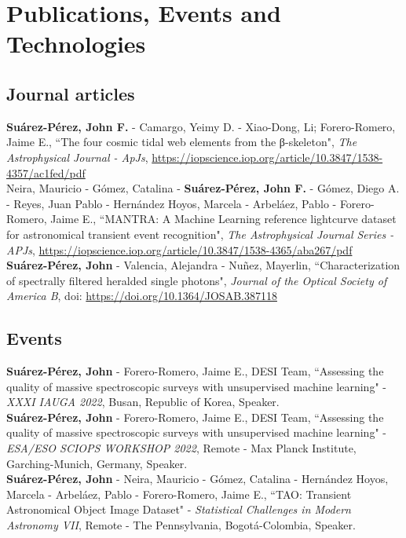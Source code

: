 \documentclass[10pt, a4paper]{article}
\newcommand{\years}[1]{\marginnote{\scriptsize #1}}
\begin{document}
\section*{Publications, Events and Technologies}

\subsection*{Journal articles}
\noindent
\years{2021}\textbf{Suárez-Pérez, John F.} - Camargo, Yeimy D. - Xiao-Dong, Li; Forero-Romero, Jaime E., “The four cosmic tidal web elements from the β-skeleton", \emph{The Astrophysical Journal - ApJs}, \url{https://iopscience.iop.org/article/10.3847/1538-4357/ac1fed/pdf} 
\\

\years{2020}Neira, Mauricio - Gómez, Catalina - \textbf{Suárez-Pérez, John F.} - Gómez, Diego A. - Reyes, Juan Pablo - Hernández Hoyos, Marcela - Arbeláez, Pablo - Forero-Romero, Jaime E., “MANTRA: A Machine Learning reference lightcurve dataset for astronomical transient event recognition", \emph{The Astrophysical Journal Series - APJs}, \url{https://iopscience.iop.org/article/10.3847/1538-4365/aba267/pdf} 
\\

\years{2020}\textbf{Suárez-Pérez, John} - Valencia, Alejandra - Nuñez, Mayerlin, “Characterization of spectrally filtered heralded single photons", \emph{Journal of the Optical Society of America B}, doi: \url{https://doi.org/10.1364/JOSAB.387118}

\subsection*{Events}
\noindent

\years{2022}\textbf{Suárez-Pérez, John} - Forero-Romero, Jaime E., DESI Team, “Assessing the quality of massive spectroscopic surveys with unsupervised machine learning" - \emph{XXXI IAUGA 2022},  Busan, Republic of Korea, Speaker.\\

\years{2022}\textbf{Suárez-Pérez, John} - Forero-Romero, Jaime E., DESI Team, “Assessing the quality of massive spectroscopic surveys with unsupervised machine learning" - \emph{ESA/ESO SCIOPS WORKSHOP 2022}, Remote - Max Planck Institute, Garching-Munich, Germany, Speaker.\\

\years{2021}\textbf{Suárez-Pérez, John} - Neira, Mauricio - Gómez, Catalina - Hernández Hoyos, Marcela - Arbeláez, Pablo - Forero-Romero, Jaime E., “TAO: Transient Astronomical Object Image Dataset" - \emph{Statistical Challenges in Modern Astronomy VII}, Remote - The Pennsylvania, Bogotá-Colombia, Speaker.\\
\end{document}
